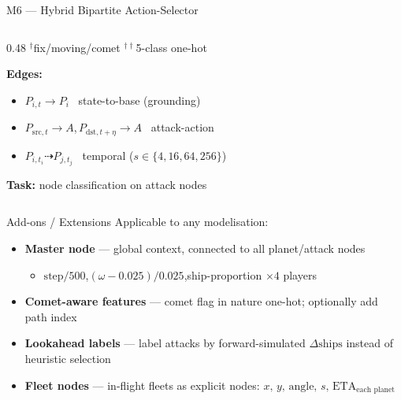 \documentclass[10pt]{beamer}
\begin{document}
\begin{frame}{M6 — Hybrid Bipartite Action-Selector}
\begin{columns}[T]
\begin{column}{0.48\textwidth}
\vspace{4pt}
{\tiny $^\dagger$fix/moving/comet \hfill $^{\dagger\dagger}$5-class one-hot}

\vspace{5pt}
\textbf{Edges:}
\begin{itemize}\scriptsize
  \item $P_{i,t}\!\to\!P_i$ \ state-to-base (grounding)
  \item $P_{\text{src},t}\!\to\!A$,\,$P_{\text{dst},t+\eta}\!\to\!A$ \ attack-action
  \item $P_{i,t_i}\!\dashrightarrow\!P_{j,t_j}$ \ temporal ($s\!\in\!\{4,16,64,256\}$)
\end{itemize}

\vspace{5pt}
\textbf{Task:} node classification on attack nodes
\end{column}

\end{columns}
\end{frame}

\begin{frame}{Add-ons / Extensions}
Applicable to any modelisation:

\begin{itemize}
  \item \textbf{Master node} — global context, connected to all planet/attack nodes
  \begin{itemize}\small
    \item $\mathrm{step}/500$,\quad $(\omega-0.025)/0.025$,\quad ship-proportion $\times4$ players
  \end{itemize}

  \vspace{4pt}
  \item \textbf{Comet-aware features} — comet flag in nature one-hot; optionally add path index

  \vspace{4pt}
  \item \textbf{Lookahead labels} — label attacks by forward-simulated $\Delta\mathrm{ships}$ instead of heuristic selection

  \vspace{4pt}
  \item \textbf{Fleet nodes} — in-flight fleets as explicit nodes:
        $x,\,y,\,\mathrm{angle},\,s,\,\mathrm{ETA}_{\text{each planet}}$
\end{itemize}
\end{frame}
\end{document}
